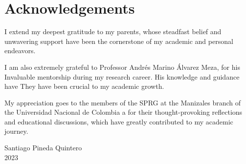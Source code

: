 \chapter*{\sffamily Acknowledgements}

I extend my deepest gratitude to my parents, whose steadfast belief and unwavering support have been the cornerstone of my academic and personal endeavors. 


I am also extremely grateful to Professor Andrés Marino Álvarez Meza, for his
Invaluable mentorship during my research career. His knowledge and guidance have
They have been crucial to my academic growth.

My appreciation goes to the members of the SPRG at the Manizales branch of the Universidad Nacional de Colombia a for their thought-provoking reflections and educational discussions, which have greatly contributed to my academic journey.


\begin{flushright}
Santiago Pineda Quintero\\
2023
\end{flushright}